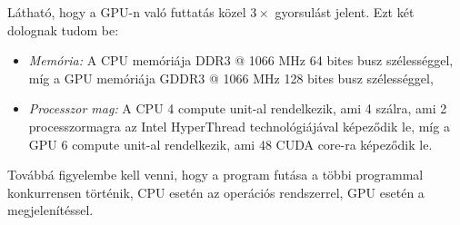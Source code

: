 	\noindent Látható, hogy a GPU-n való futtatás közel $3\times$ gyorsulást jelent.
	Ezt két dolognak tudom be:
	\begin{itemize}
		\item \emph{Memória:} A CPU memóriája DDR3 @ 1066 MHz 64 bites busz szélességgel, míg a GPU
		memóriája GDDR3 @ 1066 MHz 128 bites busz szélességgel,
		\item \emph{Processzor mag:} A CPU 4 compute unit-al rendelkezik, ami 4 szálra, ami 2
		processzormagra az Intel HyperThread technológiájával képeződik le, míg a GPU 6 compute unit-al
		rendelkezik, ami 48 CUDA core-ra képeződik le.
	\end{itemize}
	Továbbá figyelembe kell venni, hogy a program futása a többi programmal konkurrensen történik, CPU
	esetén az operációs rendszerrel, GPU esetén a megjelenítéssel.
	


\cbend